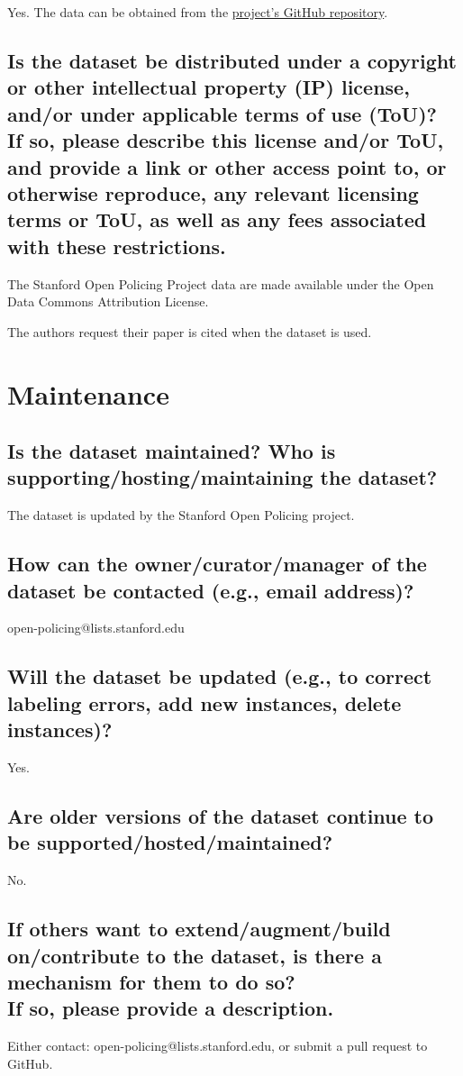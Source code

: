 \documentclass[letterpaper, 10 pt, conference]{ieeeconf}  %
\newcommand{\subtitle}[1]{{\\ \small \normalfont \color{purple} #1}}
\begin{document}
Yes. The data can be obtained  from the \href{https://github.com/stanford-policylab/opp}{project's GitHub repository}.

\subsection{Is the dataset be distributed under a copyright or other intellectual property (IP) license, and/or under applicable terms of use (ToU)? \subtitle{If so, please describe this license and/or ToU, and provide a link or other access point to, or otherwise reproduce, any relevant licensing terms or ToU, as well as any fees associated with these restrictions.}}

The Stanford Open Policing Project data are made available under the Open Data Commons Attribution License.

The authors request their paper \cite{pierson2020large} is cited when the dataset is used.

\section{Maintenance}

\subsection{Is the dataset maintained? Who is supporting/hosting/maintaining the dataset?}

The dataset is updated by the Stanford Open Policing project.

\subsection{How can the owner/curator/manager of the dataset be contacted (e.g., email address)?}

open-policing@lists.stanford.edu

\subsection{Will the dataset be updated (e.g., to correct labeling errors, add new instances, delete instances)?}

Yes.

\subsection{Are older versions of the dataset continue to be supported/hosted/maintained?}

No.

\subsection{If others want to extend/augment/build on/contribute to the dataset, is there a mechanism for them to do so? \subtitle{If so, please provide a description.}}

Either contact: open-policing@lists.stanford.edu, or submit a pull request to GitHub.

\medskip
 
  

\end{document}
